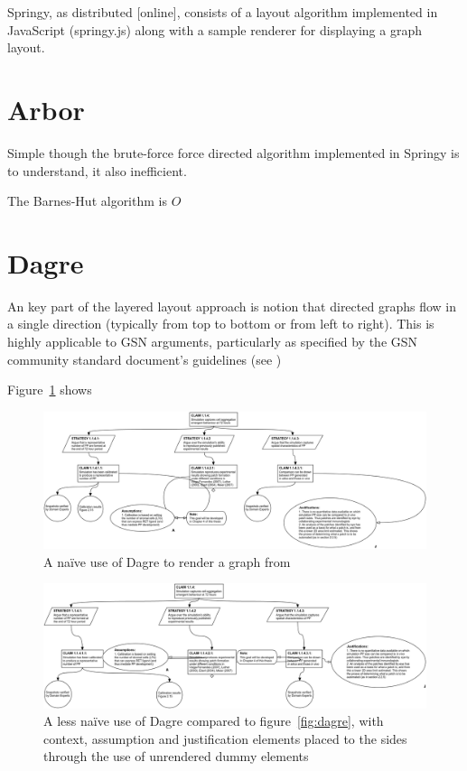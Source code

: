 Springy, as distributed [online], consists of a layout algorithm implemented in JavaScript (springy.js) along with a sample renderer for displaying a graph layout.

\section{Arbor}

Simple though the brute-force force directed algorithm implemented in Springy is to understand, it also inefficient.

The Barnes-Hut algorithm is $O$



\section{Dagre}

An key part of the layered layout approach is notion that directed graphs flow in a single direction (typically from top to bottom or from left to right). This is highly applicable to GSN arguments, particularly as specified by the GSN community standard document's guidelines \cite{gsnspec} (see )

Figure~\ref{fig:dagre1} shows

\begin{figure}
  \centering
  \includegraphics[width=\textwidth]{graphics/results/dagre.png}
  \caption{A na\"ive use of Dagre to render a graph from \cite{aldenthesis}}
  \label{fig:dagre1}
\end{figure}



\begin{figure}
  \centering
  \includegraphics[width=\textwidth]{graphics/results/dagre-enhanced.png}
  \caption{A less na\"ive use of Dagre compared to figure~\ref{fig:dagre}, with context, assumption and justification elements placed to the sides through the use of unrendered dummy elements}
  \label{fig:dagre2}
\end{figure}



